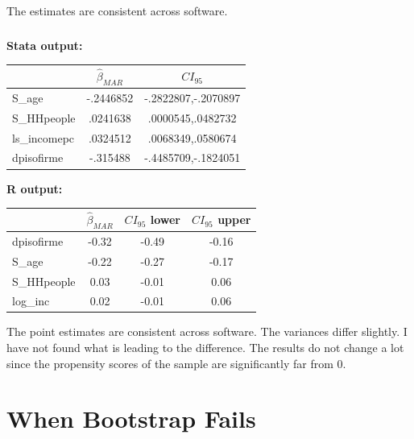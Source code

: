 \documentclass[12pt]{article}
\begin{document}
The estimates are consistent across software.

\subsubsection{}
\textbf{Stata output:}\\

\begin{tabular}{lcc}
\hline
&           $\hat \beta_{MAR}$ &     $CI_{95}$\\
\hline
S\_age       &   -.2446852&-.2822807,-.2070897\\
S\_HHpeople  &    .0241638&.0000545,.0482732\\
ls\_incomepc &    .0324512&.0068349,.0580674\\
dpisofirme  &    -.315488&-.4485709,-.1824051\\
\hline
\end{tabular}

\vspace{1cm}
\textbf{R output:}\\
\begin{tabular}{lccc}
  \hline
  & $\hat \beta_{MAR}$  & $CI_{95}$ lower & $CI_{95}$ upper \\
  \hline
  dpisofirme & -0.32  & -0.49 & -0.16 \\
    S\_age & -0.22 & -0.27 & -0.17 \\
    S\_HHpeople & 0.03  & -0.01 & 0.06 \\
    log\_inc & 0.02  & -0.01 & 0.06 \\
\hline
\end{tabular}

The point estimates are consistent across software. The variances differ slightly. I have not found what is leading to the difference. The results do not change a lot since the propensity scores of the sample are significantly far from 0.

\newpage
\section{When Bootstrap Fails}
\end{document}
